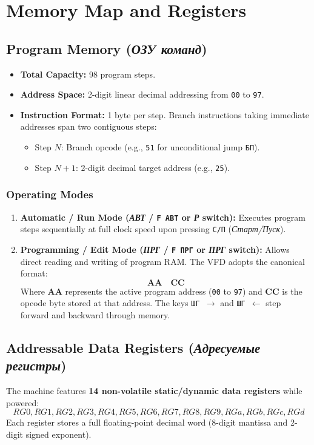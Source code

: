 \documentclass[11pt,a4paper]{article}
\begin{document}
\newpage

\section{Memory Map and Registers}

\subsection{Program Memory (\textit{ОЗУ команд})}
\begin{itemize}
    \item \textbf{Total Capacity:} 98 program steps.
    \item \textbf{Address Space:} 2-digit linear decimal addressing from \texttt{00} to \texttt{97}.
    \item \textbf{Instruction Format:} 1 byte per step. Branch instructions taking immediate addresses span two contiguous steps:
    \begin{itemize}
        \item Step $N$: Branch opcode (e.g., \texttt{51} for unconditional jump \texttt{БП}).
        \item Step $N+1$: 2-digit decimal target address (e.g., \texttt{25}).
    \end{itemize}
\end{itemize}

\subsubsection{Operating Modes}
\begin{enumerate}
    \item \textbf{Automatic / Run Mode (\textit{АВТ} / \texttt{F ABT} or \textit{Р} switch):}
    Executes program steps sequentially at full clock speed upon pressing \texttt{С/П} (\textit{Старт/Пуск}).
    \item \textbf{Programming / Edit Mode (\textit{ПРГ} / \texttt{F ПРГ} or \textit{ПРГ} switch):}
    Allows direct reading and writing of program RAM. The VFD adopts the canonical format:
    \[
    \mathbf{AA \quad CC}
    \]
    Where $\mathbf{AA}$ represents the active program address (\texttt{00} to \texttt{97}) and $\mathbf{CC}$ is the opcode byte stored at that address. The keys \texttt{ШГ $\rightarrow$} and \texttt{ШГ $\leftarrow$} step forward and backward through memory.
\end{enumerate}

\subsection{Addressable Data Registers (\textit{Адресуемые регистры})}
The machine features \textbf{14 non-volatile static/dynamic data registers} while powered:
\[
RG0, RG1, RG2, RG3, RG4, RG5, RG6, RG7, RG8, RG9, RGa, RGb, RGc, RGd
\]
Each register stores a full floating-point decimal word (8-digit mantissa and 2-digit signed exponent).
\end{document}
